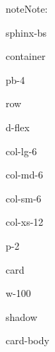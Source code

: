 \documentclass[letterpaper,10pt,english]{jupyterBook}
\begin{document}
\begin{sphinxadmonition}{note}{Note:}
\begin{sphinxuseclass}{sphinx-bs}
\begin{sphinxuseclass}{container}
\begin{sphinxuseclass}{pb-4}
\begin{sphinxuseclass}{row}
\begin{sphinxuseclass}{d-flex}
\begin{sphinxuseclass}{col-lg-6}
\begin{sphinxuseclass}{col-md-6}
\begin{sphinxuseclass}{col-sm-6}
\begin{sphinxuseclass}{col-xs-12}
\begin{sphinxuseclass}{p-2}
\begin{sphinxuseclass}{card}
\begin{sphinxuseclass}{w-100}
\begin{sphinxuseclass}{shadow}
\begin{sphinxuseclass}{card-body}
\end{sphinxuseclass}
\end{sphinxuseclass}
\end{sphinxuseclass}
\end{sphinxuseclass}
\end{sphinxuseclass}
\end{sphinxuseclass}
\end{sphinxuseclass}
\end{sphinxuseclass}
\end{sphinxuseclass}
\end{sphinxuseclass}
\end{sphinxuseclass}
\end{sphinxuseclass}
\end{sphinxuseclass}
\end{sphinxuseclass}\end{sphinxadmonition}
\end{document}
